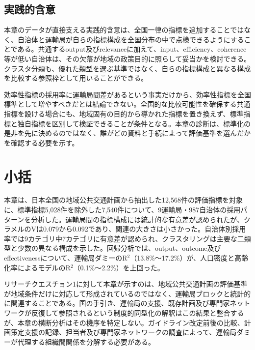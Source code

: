 \subsection{実践的含意}

本章のデータが直接支える実践的含意は、全国一律の指標を追加することではなく、自治体と運輸局が自らの指標構成を全国分布の中で点検できるようにすることである。共通するoutput及びrelevanceに加えて、input、efficiency、coherence等が低い自治体は、その欠落が地域の政策目的に照らして妥当かを検討できる。クラスタ分類も、優れた類型を選ぶ基準ではなく、自らの指標構成と異なる構成を比較する参照枠として用いることができる。

効率性指標の採用率に運輸局間差があるという事実だけから、効率性指標を全国標準として増やすべきだとは結論できない。全国的な比較可能性を確保する共通指標を設ける場合にも、地域固有の目的から導かれた指標を置き換えず、標準指標と独自指標を区別して検証できることが条件となる。本章の診断は、標準化の是非を先に決めるのではなく、誰がどの資料と手続によって評価基準を選んだかを確認する必要を示す。

\section{小括}
\label{sec:ch6_summary}

本章は、日本全国の地域公共交通計画から抽出した12,568件の評価指標を対象に、標準指標5,028件を除外した7,540件について、9運輸局・987自治体の採用パターンを分析した。運輸局間の指標構成には統計的な有意差が認められたが、クラメルのVは0.079から0.092であり、関連の大きさは小さかった。自治体別採用率では9カテゴリ中7カテゴリに有意差が認められ、クラスタリングは主要な二類型と少数の異なる構成を示した。回帰分析では、output、outcome及びeffectivenessについて、運輸局ダミーのR$^2$（13.8\%〜17.2\%）が、人口密度と高齢化率によるモデルのR$^2$（0.1\%〜2.2\%）を上回った。

リサーチクエスチョン1に対して本章が示すのは、地域公共交通計画の評価基準が地域条件だけに対応して形成されているのではなく、運輸局ブロックと統計的に関連することである。国の手引き、運輸局の支援、既存計画及び専門家ネットワークが反復して参照されるという制度的同型化の解釈はこの結果と整合するが、本章の横断分析はその機序を特定しない。ガイドライン改定前後の比較、計画策定支援の記録、担当者及び専門家ネットワークの調査によって、運輸局ダミーが代理する組織間関係を分解する必要がある。

